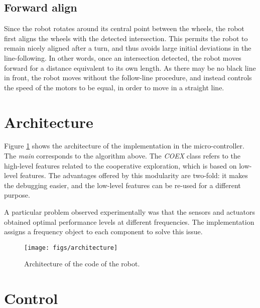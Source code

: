 \documentclass[12pt]{report}
\begin{document}
\subsection*{Forward align}
Since the robot rotates around its central point between the wheels, the robot first aligns the wheels with the detected intersection. This permits the robot to remain nicely aligned after a turn, and thus avoids large initial deviations in the line-following. In other words, once an intersection detected, the robot moves forward for a distance equivalent to its own length. As there may be no black line in front, the robot moves without the follow-line procedure, and instead controls the speed of the motors to be equal, in order to move in a straight line.

\section{Architecture}\label{sec:archi}
Figure \ref{fig:architecture} shows the architecture of the implementation in the micro-controller. The \textit{main} corresponds to the algorithm above. The \textit{COEX} class refers to the high-level features related to the cooperative exploration, which is based on low-level features. The advantages offered by this modularity are two-fold: it makes the debugging easier, and the low-level features can be re-used for a different purpose.

A particular problem observed experimentally was that the sensors and actuators obtained optimal performance levels at different frequencies. The implementation assigns a frequency object to each component to solve this issue.

\begin{figure}[!h]
\centering
\texttt{[image: figs/architecture]}
\caption{Architecture of the code of the robot.}
\label{fig:architecture}
\end{figure}


\section{Control}
\end{document}
